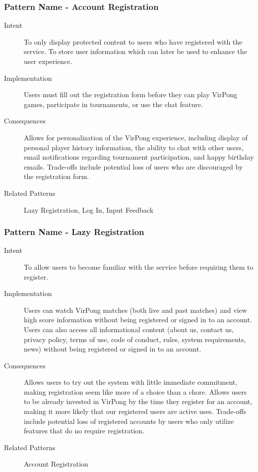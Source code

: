 \subsubsection{Pattern Name - Account Registration}
\begin{description}
\item[Intent] To only display protected content to users who have registered with the service. To store user information which can later be used to enhance the user experience.
\item[Implementation] Users must fill out the registration form before they can play VirPong games, participate in tournaments, or use the chat feature.
\item[Consequences] Allows for personalization of the VirPong experience, including display of personal player history information, the ability to chat with other users, email notifications regarding tournament participation, and happy birthday emails. Trade-offs include potential loss of users who are discouraged by the registration form.
\item[Related Patterns] Lazy Registration, Log In, Input Feedback
\end{description}
\subsubsection{Pattern Name - Lazy Registration}
\begin{description}
\item[Intent] To allow users to become familiar with the service before requiring them to register.
\item[Implementation] Users can watch VirPong matches (both live and past matches) and view high score information without being registered or signed in to an account. Users can also access all informational content (about us, contact us, privacy policy, terms of use, code of conduct, rules, system requirements, news) without being registered or signed in to an account.
\item[Consequences] Allows users to try out the system with little immediate commitment, making registration seem like more of a choice than a chore. Allows users to be already invested in VirPong by the time they register for an account, making it more likely that our registered users are active uses. Trade-offs include potential loss of registered accounts by users who only utilize features that do no require registration.
\item[Related Patterns] Account Registration
\end{description}
